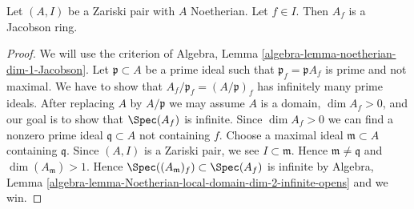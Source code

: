 \begin{lemma}
\label{lemma-noetherian-zariski-jacobson-complement}
Let $(A, I)$ be a Zariski pair with $A$ Noetherian. Let $f \in I$.
Then $A_f$ is a Jacobson ring.
\end{lemma}

\begin{proof}
We will use the criterion of
Algebra, Lemma \ref{algebra-lemma-noetherian-dim-1-Jacobson}.
Let $\mathfrak p \subset A$ be a prime ideal such that
$\mathfrak p_f = \mathfrak p A_f$ is prime and not maximal. We have to
show that $A_f/\mathfrak p_f = (A/\mathfrak p)_f$
has infinitely many prime ideals. After replacing $A$ by $A/\mathfrak p$
we may assume $A$ is a domain, $\dim A_f > 0$, and our goal is to
show that $\Spec(A_f)$ is infinite. Since $\dim A_f > 0$ we can
find a nonzero prime ideal $\mathfrak q \subset A$ not containing $f$.
Choose a maximal ideal $\mathfrak m \subset A$ containing $\mathfrak q$.
Since $(A, I)$ is a Zariski pair, we see $I \subset \mathfrak m$.
Hence $\mathfrak m \not = \mathfrak q$ and $\dim(A_\mathfrak m) > 1$.
Hence $\Spec((A_\mathfrak m)_f) \subset \Spec(A_f)$ is infinite by
Algebra, Lemma \ref{algebra-lemma-Noetherian-local-domain-dim-2-infinite-opens}
and we win.
\end{proof}











